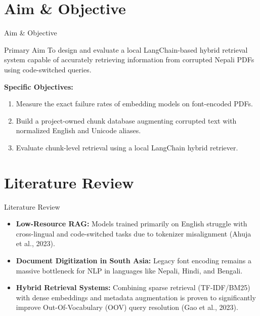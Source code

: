 \documentclass[11pt,aspectratio=169]{beamer}
\begin{document}
\section{Aim \& Objective}
\begin{frame}{Aim \& Objective}
    \begin{block}{Primary Aim}
        To design and evaluate a local LangChain-based hybrid retrieval system capable of accurately retrieving information from corrupted Nepali PDFs using code-switched queries.
    \end{block}
    \vspace{0.3cm}
    \textbf{Specific Objectives:}
    \begin{enumerate}
        \item Measure the exact failure rates of embedding models on font-encoded PDFs.
        \item Build a project-owned chunk database augmenting corrupted text with normalized English and Unicode aliases.
        \item Evaluate chunk-level retrieval using a local LangChain hybrid retriever.
    \end{enumerate}
\end{frame}

\section{Literature Review}
\begin{frame}{Literature Review}
    \begin{itemize}
        \item \textbf{Low-Resource RAG:} Models trained primarily on English struggle with cross-lingual and code-switched tasks due to tokenizer misalignment (Ahuja et al., 2023).
        \item \textbf{Document Digitization in South Asia:} Legacy font encoding remains a massive bottleneck for NLP in languages like Nepali, Hindi, and Bengali.
        \item \textbf{Hybrid Retrieval Systems:} Combining sparse retrieval (TF-IDF/BM25) with dense embeddings and metadata augmentation is proven to significantly improve Out-Of-Vocabulary (OOV) query resolution (Gao et al., 2023).
    \end{itemize}
\end{frame}

\end{document}
